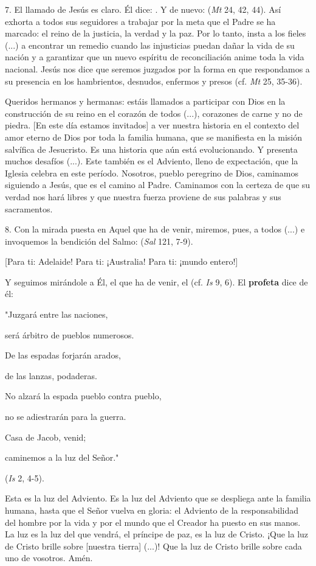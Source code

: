\begin{body}
	7. El llamado de Jesús es claro. Él dice: . Y de nuevo:  (\emph{Mt} 24, 42, 44). Así exhorta a todos sus seguidores a trabajar por la meta que el Padre se ha marcado: el reino de la justicia, la verdad y la paz. Por lo tanto, insta a los fieles (...) a encontrar un remedio cuando las injusticias puedan dañar la vida de su nación y a garantizar que un nuevo espíritu de reconciliación anime toda la vida nacional. Jesús nos dice que seremos juzgados por la forma en que respondamos a su presencia en los hambrientos, desnudos, enfermos y presos (cf. \emph{Mt} 25, 35-36).
	
	Queridos hermanos y hermanas: estáis llamados a participar con Dios en la construcción de su reino en el corazón de todos (...), corazones de carne y no de piedra. {[}En este día estamos invitados{]} a ver nuestra historia en el contexto del amor eterno de Dios por toda la familia humana, que se manifiesta en la misión salvífica de Jesucristo. Es una historia que aún está evolucionando. Y presenta muchos desafíos (...). Este también es el Adviento, lleno de expectación, que la Iglesia celebra en este período. Nosotros, pueblo peregrino de Dios, caminamos siguiendo a Jesús, que es el camino al Padre. Caminamos con la certeza de que su verdad nos hará libres y que nuestra fuerza proviene de sus palabras y sus sacramentos.
	
	8. Con la mirada puesta en Aquel que ha de venir, miremos, pues, a todos (...) e invoquemos la bendición del Salmo:  (\emph{Sal} 121, 7-9).
	
	{[}Para ti: Adelaide! Para ti: ¡Australia! Para ti: ¡mundo entero!{]}
	
	Y seguimos mirándole a Él, el que ha de venir, el  (cf. \emph{Is} 9, 6). El \textbf{profeta} dice de él:
	
	"Juzgará entre las naciones,
	
	será árbitro de pueblos numerosos.
	
	De las espadas forjarán arados,
	
	de las lanzas, podaderas.
	
	No alzará la espada pueblo contra pueblo,
	
	no se adiestrarán para la guerra.
	
	Casa de Jacob, venid;
	
	caminemos a la luz del Señor."
	
	(\emph{Is} 2, 4-5).
	
	Esta es la luz del Adviento. Es la luz del Adviento que se despliega ante la familia humana, hasta que el Señor vuelva en gloria: el Adviento de la responsabilidad del hombre por la vida y por el mundo que el Creador ha puesto en sus manos. La luz es la luz del que vendrá, el príncipe de paz, es la luz de Cristo. ¡Que la luz de Cristo brille sobre {[}nuestra tierra{]} (...)! Que la luz de Cristo brille sobre cada uno de vosotros. Amén.
\end{body}

